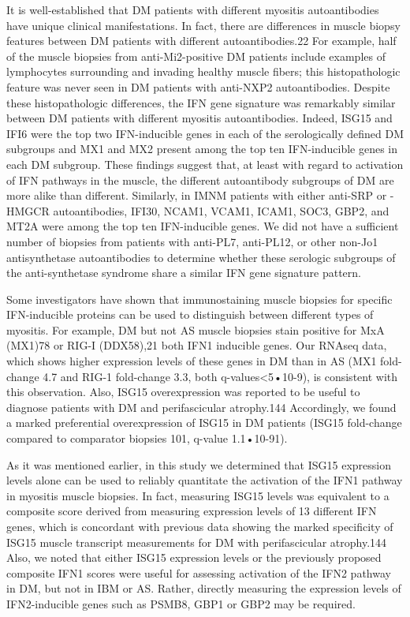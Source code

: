 It is well-established that DM patients with different myositis autoantibodies have unique clinical manifestations. In fact, there are differences in muscle biopsy features between DM patients with different autoantibodies.22 For example, half of the muscle biopsies from anti-Mi2-positive DM patients include examples of lymphocytes surrounding and invading healthy muscle fibers; this histopathologic feature was never seen in DM patients with anti-NXP2 autoantibodies. Despite these histopathologic differences, the IFN gene signature was remarkably similar between DM patients with different myositis autoantibodies. Indeed, ISG15 and IFI6 were the top two IFN-inducible genes in each of the serologically defined DM subgroups and MX1 and MX2 present among the top ten IFN-inducible genes in each DM subgroup. These findings suggest that, at least with regard to activation of IFN pathways in the muscle, the different autoantibody subgroups of DM are more alike than different. Similarly, in IMNM patients with either anti-SRP or -HMGCR autoantibodies, IFI30, NCAM1, VCAM1, ICAM1, SOC3, GBP2, and MT2A were among the top ten IFN-inducible genes. We did not have a sufficient number of biopsies from patients with anti-PL7, anti-PL12, or other non-Jo1 antisynthetase autoantibodies to determine whether these serologic subgroups of the anti-synthetase syndrome share a similar IFN gene signature pattern.

Some investigators have shown that immunostaining muscle biopsies for specific IFN-inducible proteins can be used to distinguish between different types of myositis. For example, DM but not AS muscle biopsies stain positive for MxA (MX1)78 or RIG-I (DDX58),21 both IFN1 inducible genes. Our RNAseq data, which shows higher expression levels of these genes in DM than in AS (MX1 fold-change 4.7 and RIG-1 fold-change 3.3, both q-values<5•10-9), is consistent with this observation. Also, ISG15 overexpression was reported to be useful to diagnose patients with DM and perifascicular atrophy.144 Accordingly, we found a marked preferential overexpression of ISG15 in DM patients (ISG15 fold-change compared to comparator biopsies 101, q-value 1.1•10-91).

As it was mentioned earlier, in this study we determined that ISG15 expression levels alone can be used to reliably quantitate the activation of the IFN1 pathway in myositis muscle biopsies. In fact, measuring ISG15 levels was equivalent to a composite score derived from measuring expression levels of 13 different IFN genes, which is concordant with previous data showing the marked specificity of ISG15 muscle transcript measurements for DM with perifascicular atrophy.144 Also, we noted that either ISG15 expression levels or the previously proposed composite IFN1 scores were useful for assessing activation of the IFN2 pathway in DM, but not in IBM or AS. Rather, directly measuring the expression levels of IFN2-inducible genes such as PSMB8, GBP1 or GBP2 may be required. 

